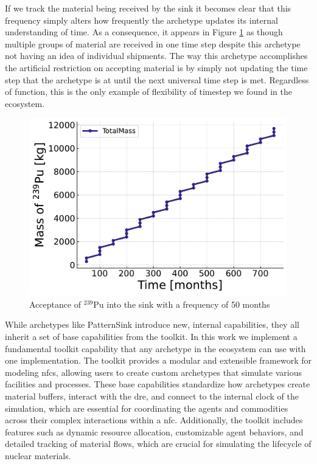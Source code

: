 If we track the material being received by the sink it becomes clear that this frequency simply alters how frequently the archetype updates its internal understanding of time. As a consequence, it appears in Figure \ref{fig:pattern_freq_50} as though multiple groups of material are received in one time step despite this archetype not having an idea of individual shipments. The way this archetype accomplishes the artificial restriction on accepting material is by simply not updating the time step that the archetype is at until the next universal time step is met. Regardless of function, this is the only example of flexibility of timestep we found in the ecosystem.

\begin{figure}[!ht]
    \centering
    \includegraphics[scale=0.75]{images/cyclus/pattern_sink_fuel_transactions.pdf}
    \caption{Acceptance of $^{239}$Pu into the sink with a frequency of 50 months}
    \label{fig:pattern_freq_50}
\end{figure}

While archetypes like PatternSink introduce new, internal capabilities, they all inherit a set of base capabilities from the \cyclus toolkit. In this work we implement a fundamental toolkit capability that any archetype in the \cyclus ecosystem can use with one implementation. The \cyclus toolkit provides a modular and extensible framework for modeling \glspl{nfc}, allowing users to create custom archetypes that simulate various facilities and processes. These base capabilities standardize how archetypes create material buffers, interact with the \gls{dre}, and connect to the internal clock of the simulation, which are essential for coordinating the agents and commodities across their complex interactions within a \gls{nfc}. Additionally, the toolkit includes features such as dynamic resource allocation, customizable agent behaviors, and detailed tracking of material flows, which are crucial for simulating the lifecycle of nuclear materials.

